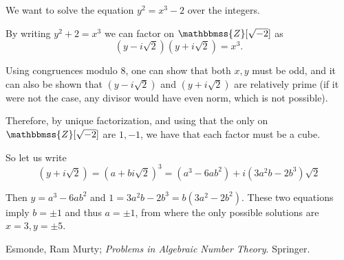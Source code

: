 \documentclass[12pt]{article}
\newcommand{\Z}{\mathbbmss{Z}}
\begin{document}
We want to solve the equation $y^2=x^3 - 2$ over the integers.

By writing $y^2+2=x^3$ we can factor on $\Z[\sqrt{-2}]$ as
\[(y-i\sqrt{2})(y+i\sqrt{2})=x^3.
\]

Using congruences modulo $8$, one can show that both $x,y$ must be odd, and it can also be shown that $(y-i\sqrt{2})$ and $(y+i\sqrt{2})$ are relatively prime (if it were not the case, any divisor would have even norm, which is not possible).

Therefore, by unique factorization, and using that the only  on $\Z[\sqrt{-2}]$ are $1,-1$, we have that each factor must be a cube.

So let us write
\[
(y+i\sqrt{2}) = (a+bi\sqrt{2})^3 = (a^3 - 6ab^2) + i(3a^2b-2b^3)\sqrt{2}
\]

Then $y=a^3 - 6ab^2$ and $1=3a^2b-2b^3=b(3a^2-2b^2)$. These two equations imply $b=\pm 1$ and thus $a=\pm 1$, from where the only possible solutions are $x=3, y=\pm 5$.

\begin{thebibliography}{9}
  Esmonde, Ram Murty; \emph{Problems in Algebraic Number Theory}. Springer.
\end{thebibliography}
\end{document}
